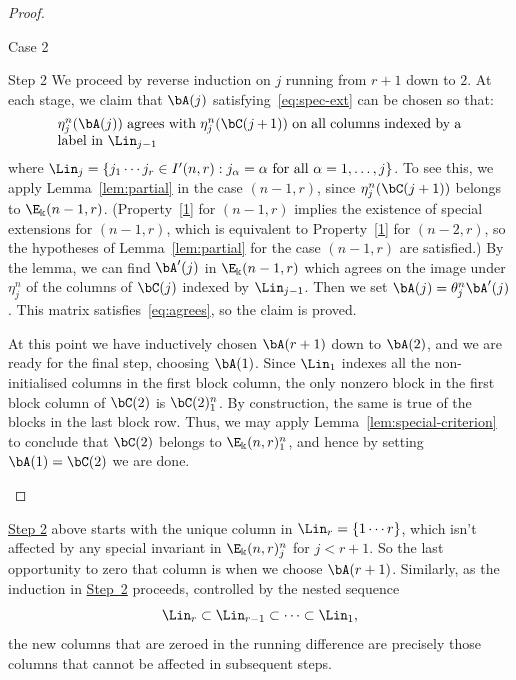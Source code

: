 \begin{proof}
\begin{enonce*}{\hypertarget{Case 2}{Case 2}}
\begin{enonce*}[remark]{\hypertarget{Step 2}{Step 2}} We proceed by reverse induction on $j$ running from
$r+1$ down to $2$. At each stage, we claim that $\bA(j)$ satisfying~\eqref{eq:spec-ext} can be chosen so that:
\begin{equation}\label{eq:agrees}
 \begin{minipage}{4in}
 $\eta^n_j(\bA(j))$ agrees with $\eta^n_j(\bC(j+1))$ on all columns
 indexed by a label in $\Lin_{j-1}$
 \end{minipage}
\end{equation}
where $\Lin_j = \{j_1\cdots j_r \in I'(n,r): j_\alpha=\alpha \text{
 for all } \alpha=1, \dots, j\}$. To see this, we apply Lemma~\ref{lem:partial} in the case $(n-1,r)$, since $\eta^n_j(\bC(j+1))$
belongs to $\E_\Bbbk(n-1,r)$. (Property~\ref{1} for $(n-1,r)$ implies
the existence of special extensions for $(n-1,r)$, which is equivalent
to Property~\ref{1} for $(n-2,r)$, so the hypotheses of Lemma~\ref{lem:partial} for the case $(n-1,r)$ are satisfied.) By the lemma, we can find $\bA'(j)$ in $\E_\Bbbk(n-1,r)$ which agrees on the image
under $\eta^n_j$ of the columns of $\bC(j)$ indexed by
$\Lin_{j-1}$. Then we set $\bA(j) = \theta^n_j \bA'(j)$. This matrix
satisfies~\eqref{eq:agrees}, so the claim is proved.

At this point we have inductively chosen $\bA(r+1)$ down to $\bA(2)$,
and we are ready for the final step, choosing $\bA(1)$. Since
$\Lin_1$ indexes all the non-initialised columns in the first block
column, the only nonzero block in the first block column of $\bC(2)$
is $\bC(2)^n_1$. By construction, the same is true of the blocks in
the last block row. Thus, we may apply Lemma~\ref{lem:special-criterion} to conclude that $\bC(2)$ belongs to $\E_\Bbbk(n,r)^n_1$, and hence by setting $\bA(1) = \bC(2)$ we are
done.\qedhere
\end{enonce*}
\end{enonce*}
\end{proof}


\hyperlink{Step 2}{Step 2} above starts with the unique column in $\Lin_r = \{1 \cdots
r\}$, which isn't affected by any special invariant in
$\E_\Bbbk(n,r)^n_j$ for $j<r+1$. So the last opportunity to zero that
column is when we choose $\bA(r+1)$. Similarly, as the induction in
\hyperlink{Step 2}{Step~2} proceeds, controlled by the nested sequence
\[
\Lin_{r} \subset \Lin_{r-1} \subset \cdots \subset \Lin_1,
\]
the new columns that are zeroed in the running difference are
precisely those columns that cannot be affected in subsequent steps. 

